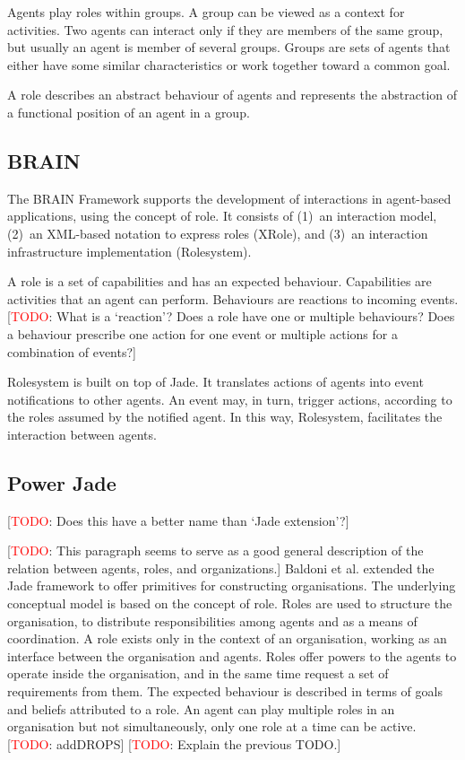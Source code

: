 \documentclass{article}
\newcommand{\todo}[1]{[\textcolor{red}{TODO}: #1]}
\begin{document}
Agents play roles within groups. A group can be viewed as a
context for activities. Two agents can interact only if they are
members of the same group, but usually an agent is member of
several groups. Groups are sets of agents that either have some
similar characteristics or work together toward a common goal.

A role describes an abstract behaviour of agents and represents the
abstraction of a functional position of an agent in a group.

\subsection{BRAIN} 

The BRAIN Framework \cite{conf/coopis/CabriLZ03} supports the development of
interactions in agent-based applications, using the concept of role. It
consists of (1)~an interaction model, (2)~an XML-based notation to express
roles (XRole), and (3)~an interaction infrastructure implementation
(Rolesystem).

A role is a set of capabilities and has an expected behaviour.
Capabilities are activities that an agent can perform. Behaviours
are reactions to incoming events. \todo{What is a `reaction'?
Does a role have one or multiple behaviours? Does a behaviour
prescribe one action for one event or multiple actions for a
combination of events?}

Rolesystem is built on top of Jade. It translates actions of
agents into event notifications to other agents. An event may,
in turn, trigger actions, according to the roles assumed by
the notified agent. In this way, Rolesystem, facilitates the
interaction between agents.

\subsection{Power Jade}

\todo{Does this have a better name than `Jade extension'?}

\todo{This paragraph seems to serve as a good general description of the
relation between agents, roles, and organizations.} Baldoni et al.
\cite{conf/mates/BaldoniBGGT08} extended the Jade framework to offer primitives
for constructing organisations. The underlying conceptual model is based on the
concept of role. Roles are used to structure the organisation, to distribute
responsibilities among agents and as a means of coordination. A role exists
only in the context of an organisation, working as an interface between the
organisation and agents. Roles offer powers to the agents to operate inside the
organisation, and in the same time request a set of requirements from them. The
expected behaviour is described in terms of goals and beliefs attributed to a
role. An agent can play multiple roles in an organisation but not
simultaneously, only one role at a time can be active.  \todo{addDROPS}
\todo{Explain the previous TODO.}
\end{document}
